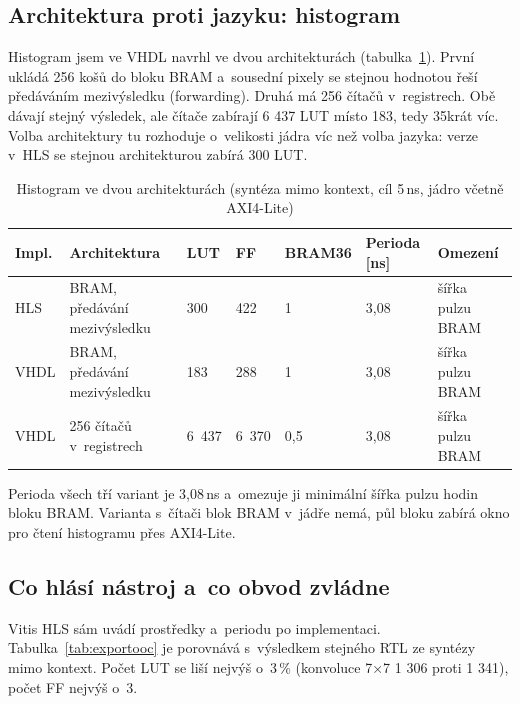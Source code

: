 
\subsection{Architektura proti jazyku: histogram}

Histogram jsem ve VHDL navrhl ve dvou architekturách (tabulka~\ref{tab:histarch}). První ukládá 256 košů do bloku BRAM a~sousední pixely se stejnou hodnotou řeší předáváním mezivýsledku (forwarding). Druhá má 256 čítačů v~registrech. Obě dávají stejný výsledek, ale čítače zabírají 6 437 LUT místo 183, tedy 35krát víc. Volba architektury tu rozhoduje o~velikosti jádra víc než volba jazyka: verze v~HLS se stejnou architekturou zabírá 300 LUT.


\begin{table}[htbp]
    \centering
    \caption{Histogram ve dvou architekturách (syntéza mimo kontext, cíl 5\,ns, jádro včetně AXI4-Lite)}
    \label{tab:histarch}
    \begin{tabular}{p{1.3cm}p{4.4cm}p{1.3cm}p{1.3cm}p{1.4cm}p{1.6cm}p{2.8cm}}
        \toprule
        Impl. & Architektura & LUT & FF & BRAM36 & Perioda [ns] & Omezení \\
        \midrule
        HLS & BRAM, předávání mezivýsledku & 300 & 422 & 1 & 3,08 & šířka pulzu BRAM \\
        VHDL & BRAM, předávání mezivýsledku & 183 & 288 & 1 & 3,08 & šířka pulzu BRAM \\
        VHDL & 256 čítačů v~registrech & 6 437 & 6 370 & 0,5 & 3,08 & šířka pulzu BRAM \\
        \bottomrule
    \end{tabular}
\end{table}


Perioda všech tří variant je 3,08\,ns a~omezuje ji minimální šířka pulzu hodin bloku BRAM. Varianta s~čítači blok BRAM v~jádře nemá, půl bloku zabírá okno pro čtení histogramu přes AXI4-Lite.


\subsection{Co hlásí nástroj a~co obvod zvládne}

Vitis HLS sám uvádí prostředky a~periodu po implementaci. Tabulka~\ref{tab:exportooc} je porovnává s~výsledkem stejného RTL ze syntézy mimo kontext. Počet LUT se liší nejvýš o~3\,\% (konvoluce 7×7 1 306 proti 1 341), počet FF nejvýš o~3.

